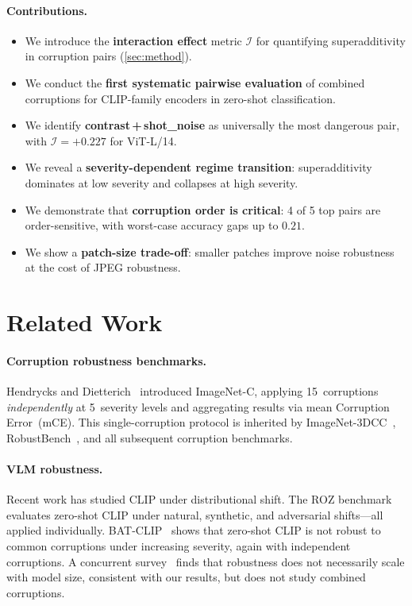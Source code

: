 \documentclass[10pt, twocolumn]{article}
\newcommand{\cI}{\mathcal{I}}          %
\begin{document}
\paragraph{Contributions.}
\begin{itemize}[leftmargin=*]
  \item We introduce the \textbf{interaction effect} metric $\cI$
        for quantifying superadditivity in corruption pairs
        (\cref{sec:method}).
  \item We conduct the \textbf{first systematic pairwise
        evaluation} of combined corruptions for CLIP-family
        encoders in zero-shot classification.
  \item We identify \textbf{contrast\,+\,shot\_noise} as
        universally the most dangerous pair, with $\cI=+0.227$
        for ViT-L/14.
  \item We reveal a \textbf{severity-dependent regime
        transition}: superadditivity dominates at low severity
        and collapses at high severity.
  \item We demonstrate that \textbf{corruption order is
        critical}: 4 of 5 top pairs are order-sensitive,
        with worst-case accuracy gaps up to $0.21$.
  \item We show a \textbf{patch-size trade-off}: smaller
        patches improve noise robustness at the cost of
        JPEG robustness.
\end{itemize}

\section{Related Work}
\label{sec:related}

\paragraph{Corruption robustness benchmarks.}
Hendrycks and Dietterich~\cite{hendrycks2019benchmarking}
introduced ImageNet-C, applying 15~corruptions
\emph{independently} at 5~severity levels and aggregating
results via mean Corruption Error~(mCE).
This single-corruption protocol is inherited by
ImageNet-3DCC~\cite{kar2022imagenet3dcc},
RobustBench~\cite{croce2021robustbench}, and all subsequent
corruption benchmarks.

\paragraph{VLM robustness.}
Recent work has studied CLIP under distributional shift.
The ROZ benchmark~\cite{roz2024} evaluates zero-shot CLIP
under natural, synthetic, and adversarial shifts---all applied
individually.
BAT-CLIP~\cite{batclip2024} shows that zero-shot CLIP is
not robust to common corruptions under increasing severity,
again with independent corruptions.
A concurrent survey~\cite{wang2024survey} finds that
robustness does not necessarily scale with model size,
consistent with our results, but does not study combined
corruptions.
\end{document}
